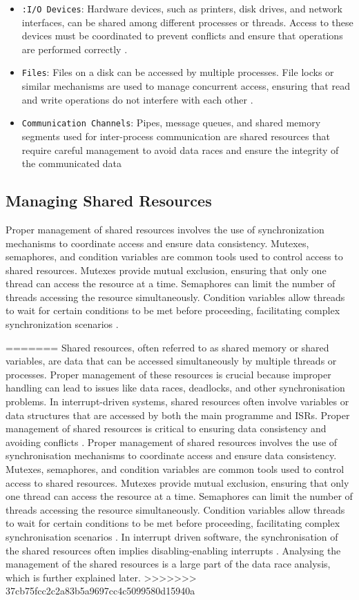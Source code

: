 \documentclass[
fancyheadings, %
%
%
]{stsreprt}
\begin{document}
{\begin{itemize}
	\item \texttt{:I/O Devices}: Hardware devices, such as printers, disk drives, and network interfaces, can be shared among different processes or threads. Access to these devices must be coordinated to prevent conflicts and ensure that operations are performed correctly \cite{burns2009}.

	\item \texttt{Files}: Files on a disk can be accessed by multiple processes. File locks or similar mechanisms are used to manage concurrent access, ensuring that read and write operations do not interfere with each other \cite{labrosse2002}.

	\item \texttt{Communication Channels}: Pipes, message queues, and shared memory segments used for inter-process communication are shared resources that require careful management to avoid data races and ensure the integrity of the communicated data \cite{herlihy2008}
\end{itemize}
\subsection{Managing Shared Resources}
Proper management of shared resources involves the use of synchronization mechanisms to coordinate access and ensure data consistency. Mutexes, semaphores, and condition variables are common tools used to control access to shared resources. Mutexes provide mutual exclusion, ensuring that only one thread can access the resource at a time. Semaphores can limit the number of threads accessing the resource simultaneously. Condition variables allow threads to wait for certain conditions to be met before proceeding, facilitating complex synchronization scenarios \cite{herlihy2008}.

=======
Shared resources, often referred to as shared memory or shared variables, are data that can be accessed simultaneously by multiple threads or processes. Proper management of these resources is crucial because improper handling can lead to issues like data races, deadlocks, and other synchronisation problems. In interrupt-driven systems, shared resources often involve variables or data structures that are accessed by both the main programme and ISRs. Proper management of shared resources is critical to ensuring data consistency and avoiding conflicts \cite{herlihy2008}.
Proper management of shared resources involves the use of synchronisation mechanisms to coordinate access and ensure data consistency. Mutexes, semaphores, and condition variables are common tools used to control access to shared resources. Mutexes provide mutual exclusion, ensuring that only one thread can access the resource at a time. Semaphores can limit the number of threads accessing the resource simultaneously. Condition variables allow threads to wait for certain conditions to be met before proceeding, facilitating complex synchronisation scenarios \cite{herlihy2008}. In interrupt driven software, the synchronisation of the shared resources often implies disabling-enabling interrupts \cite{chopra2019}. Analysing the management of the shared resources is a large part of the data race analysis, which is further explained later.
>>>>>>> 37cb75fcc2c2a83b5a9697cc4c5099580d15940a
}
\end{document}
